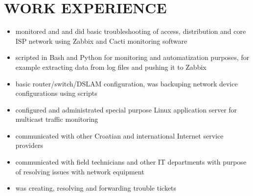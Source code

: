 \documentclass{cv}
\begin{document}
\section{WORK EXPERIENCE}
\begin{itemize}
    \setlength\itemsep{0.1cm}
    \item monitored and and did basic troubleshooting of access, distribution and core ISP network using Zabbix and
Cacti monitoring software
    \item scripted in Bash and Python for monitoring and automatization purposes, for example extracting data from log
files and pushing it to Zabbix
    \item basic router/switch/DSLAM configuration, was backuping network device configurations using scripts
    \item configured and administrated special purpose Linux application server for multicast traffic monitoring
    \item communicated with other Croatian and international Internet service providers
    \item communicated with field technicians and other IT departments with purpose of resolving issues with
network equipment
    \item was creating, resolving and forwarding trouble tickets
\end{itemize}
\end{document}
